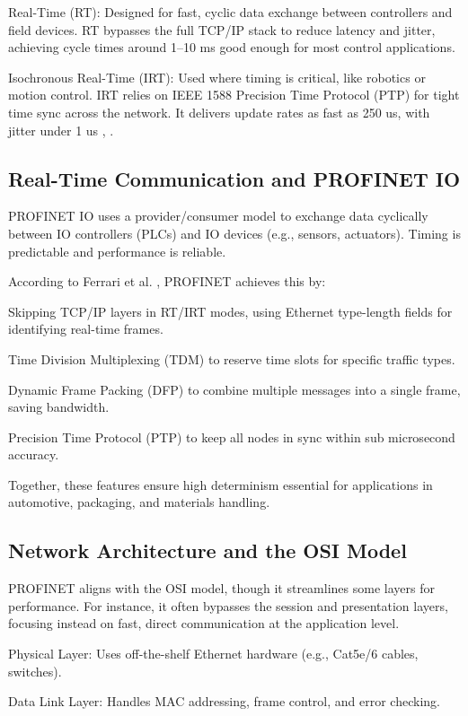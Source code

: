 \documentclass[conference]{IEEEtran}
\begin{document}
Real-Time (RT): Designed for fast, cyclic data exchange between controllers and field devices. RT bypasses the full TCP/IP stack to reduce latency and jitter, achieving cycle times around 1–10 ms good enough for most control applications.

Isochronous Real-Time (IRT): Used where timing is critical, like robotics or motion control. IRT relies on IEEE 1588 Precision Time Protocol (PTP) for tight time sync across the network. It delivers update rates as fast as 250 us, with jitter under 1 us \cite{ferrari2004profinet}, \cite{schumacher2008profinet}.

\subsection{Real-Time Communication and PROFINET IO} 
PROFINET IO uses a provider/consumer model to exchange data cyclically between IO controllers (PLCs) and IO devices (e.g., sensors, actuators). Timing is predictable and performance is reliable.

According to Ferrari et al. \cite{ferrari2004profinet}, PROFINET achieves this by:

Skipping TCP/IP layers in RT/IRT modes, using Ethernet type-length fields for identifying real-time frames.

Time Division Multiplexing (TDM) to reserve time slots for specific traffic types.

Dynamic Frame Packing (DFP) to combine multiple messages into a single frame, saving bandwidth.

Precision Time Protocol (PTP) to keep all nodes in sync within sub microsecond accuracy.

Together, these features ensure high determinism essential for applications in automotive, packaging, and materials handling.

\subsection{Network Architecture and the OSI Model} 
PROFINET aligns with the OSI model, though it streamlines some layers for performance. For instance, it often bypasses the session and presentation layers, focusing instead on fast, direct communication at the application level.

Physical Layer: Uses off-the-shelf Ethernet hardware (e.g., Cat5e/6 cables, switches).

Data Link Layer: Handles MAC addressing, frame control, and error checking.
\end{document}

